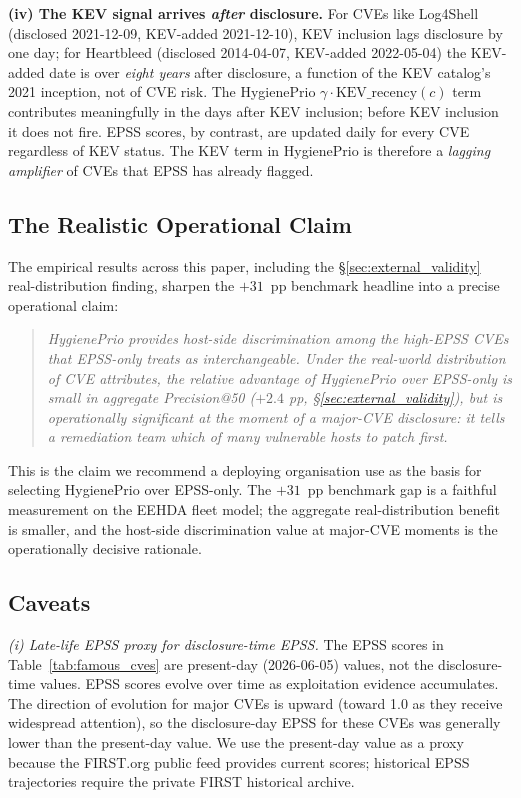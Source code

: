 \textbf{(iv) The KEV signal arrives \emph{after} disclosure.} For
CVEs like Log4Shell (disclosed 2021-12-09, KEV-added 2021-12-10),
KEV inclusion lags disclosure by one day; for Heartbleed (disclosed
2014-04-07, KEV-added 2022-05-04) the KEV-added date is over
\emph{eight years} after disclosure, a function of the KEV
catalog's 2021 inception, not of CVE risk. The HygienePrio
$\gamma \cdot \mathrm{KEV\_recency}(c)$ term contributes meaningfully
in the days after KEV inclusion; before KEV inclusion it does not
fire. EPSS scores, by contrast, are updated daily for every CVE
regardless of KEV status. The KEV term in HygienePrio is therefore
a \emph{lagging amplifier} of CVEs that EPSS has already flagged.

\subsection{The Realistic Operational Claim}

The empirical results across this paper, including the
\S\ref{sec:external_validity} real-distribution finding, sharpen the
$+31$~pp benchmark headline into a precise operational claim:

\begin{quote}
\emph{HygienePrio provides host-side discrimination among the high-EPSS
CVEs that EPSS-only treats as interchangeable. Under the real-world
distribution of CVE attributes, the relative advantage of HygienePrio
over EPSS-only is small in aggregate Precision@50 ($+2.4$ pp,
\S\ref{sec:external_validity}), but is operationally significant at
the moment of a major-CVE disclosure: it tells a remediation team
which of many vulnerable hosts to patch first.}
\end{quote}

This is the claim we recommend a deploying
organisation use as the basis for selecting HygienePrio over
EPSS-only. The $+31$~pp benchmark gap is a faithful measurement on the EEHDA
fleet model; the aggregate real-distribution benefit is smaller, and the
host-side discrimination value at major-CVE moments is the
operationally decisive rationale.

\subsection{Caveats}

\textit{(i) Late-life EPSS proxy for disclosure-time EPSS.}
The EPSS scores in Table~\ref{tab:famous_cves} are present-day
(2026-06-05) values, not the disclosure-time values. EPSS scores
evolve over time as exploitation evidence accumulates. The
direction of evolution for major CVEs is upward (toward 1.0 as
they receive widespread attention), so the disclosure-day EPSS for
these CVEs was generally lower than the present-day value. We use
the present-day value as a proxy because the FIRST.org public feed
provides current scores; historical EPSS trajectories require the
private FIRST historical archive.

